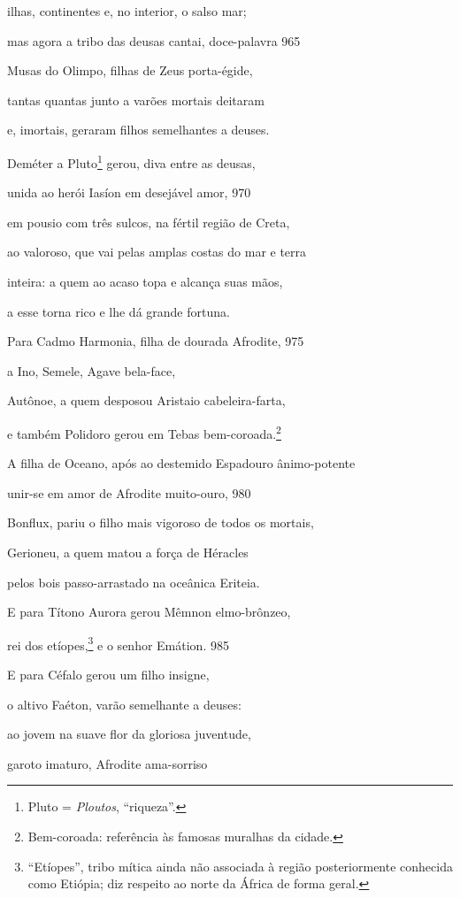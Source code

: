 ilhas, continentes e, no interior, o salso mar;

mas agora a tribo das deusas cantai, doce-palavra \num{965}

Musas do Olimpo, filhas de Zeus porta-égide,

tantas quantas junto a varões mortais deitaram

e, imortais, geraram filhos semelhantes a deuses.

\quad{}Deméter a Pluto\footnote{Pluto = \emph{Ploutos}, ``riqueza''.} gerou, diva entre as deusas,

unida ao herói Iasíon em desejável amor, \num{970}

em pousio com três sulcos, na fértil região de Creta,

ao valoroso, que vai pelas amplas costas do mar e terra

inteira: a quem ao acaso topa e alcança suas mãos,

a esse torna rico e lhe dá grande fortuna.

\quad{}Para Cadmo Harmonia, filha de dourada Afrodite, \num{975}

a Ino, Semele, Agave bela-face,

Autônoe, a quem desposou Aristaio cabeleira-farta,

e também Polidoro gerou em Tebas bem-coroada.\footnote{Bem-coroada: referência às famosas muralhas da cidade.}

\quad{}A filha de Oceano, após ao destemido Espadouro \qb{}ânimo-potente

unir-se em amor de Afrodite muito-ouro, \num{980}

Bonflux, pariu o filho mais vigoroso de todos os mortais,

Gerioneu, a quem matou a força de Héracles

pelos bois passo-arrastado na oceânica Eriteia.

\quad{}E para Títono Aurora gerou Mêmnon elmo-brônzeo,

rei dos etíopes,\footnote{``Etíopes'', tribo mítica ainda não associada à região
posteriormente conhecida como Etiópia; diz respeito ao norte da África
de forma geral.} e o senhor Emátion. \num{985}

E para Céfalo gerou um filho insigne,

o altivo Faéton, varão semelhante a deuses:

ao jovem na suave flor da gloriosa juventude,

garoto imaturo, Afrodite ama-sorriso

